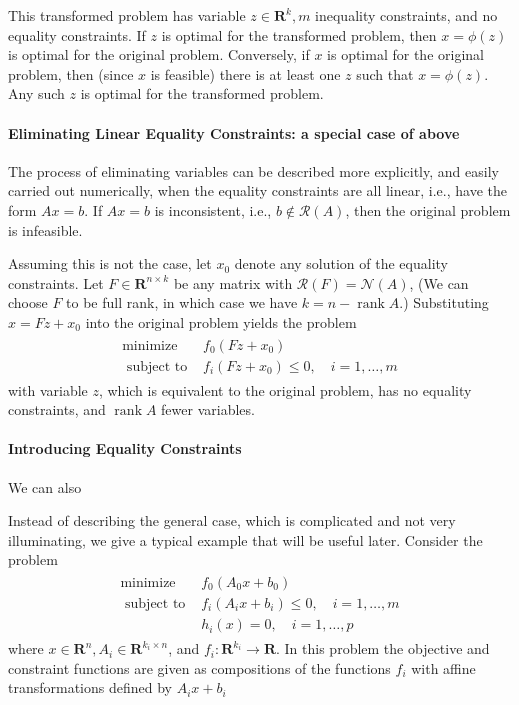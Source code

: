 \documentclass{article}
\begin{document}
This transformed problem has variable $z \in \mathbf{R}^{k}, m$ inequality constraints, and no equality constraints. If $z$ is optimal for the transformed problem, then $x=\phi(z)$ is optimal for the original problem. Conversely, if $x$ is optimal for the original problem, then (since $x$ is feasible) there is at least one $z$ such that $x=\phi(z)$. Any such $z$ is optimal for the transformed problem.
\paragraph{Eliminating Linear Equality Constraints: a special case of above}
The process of eliminating variables can be described more explicitly, and easily carried out numerically, when the equality constraints are all linear, i.e., have the form $A x=b$. If $A x=b$ is inconsistent, i.e., $b \notin \mathcal{R}(A)$, then the original problem is infeasible. 

Assuming this is not the case, let $x_{0}$ denote any solution of the equality constraints. Let $F \in \mathbf{R}^{n \times k}$ be any matrix with $\mathcal{R}(F)=\mathcal{N}(A)$,  (We can choose $F$ to be full rank, in which case we have $k=n-\operatorname{rank} A$.)
Substituting $x=F z+x_{0}$ into the original problem yields the problem
\begin{align*}
\begin{array}{ll}
\operatorname{minimize} & f_{0}\left(F z+x_{0}\right) \\
\text { subject to } & f_{i}\left(F z+x_{0}\right) \leq 0, \quad i=1, \ldots, m
\end{array}
\end{align*}
with variable $z$, which is equivalent to the original problem, has no equality constraints, and $\operatorname{rank} A$ fewer variables.
\paragraph{Introducing Equality Constraints}\label{sec:agvhaf}
We can also  

Instead of describing the general case, which is complicated and not very illuminating, we give a typical example that will be useful later. Consider the problem
\begin{align*}
\begin{array}{ll}
\operatorname{minimize} & f_{0}\left(A_{0} x+b_{0}\right) \\
\text { subject to } & f_{i}\left(A_{i} x+b_{i}\right) \leq 0, \quad i=1, \ldots, m \\
& h_{i}(x)=0, \quad i=1, \ldots, p
\end{array}
\end{align*}
where $x \in \mathbf{R}^{n}, A_{i} \in \mathbf{R}^{k_{i} \times n}$, and $f_{i}: \mathbf{R}^{k_{i}} \rightarrow \mathbf{R} .$ In this problem the objective and constraint functions are given as compositions of the functions $f_{i}$ with affine transformations defined by $A_{i} x+b_{i}$
\end{document}
